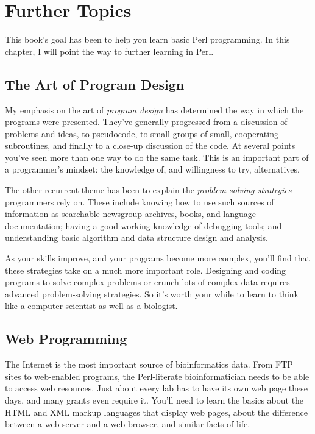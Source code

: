\chapter{Further Topics}
\label{chap:chapter13}
\minitoc

This book's goal has been to help you learn basic Perl programming. In this chapter, I will point the way to further learning in Perl.

\section{The Art of Program Design}
My emphasis on the art of \textit{program design} has determined the way in which the programs were presented. They've generally progressed from a discussion of problems and ideas, to pseudocode, to small groups of small, cooperating subroutines, and finally to a close-up discussion of the code. At several points you've seen more than one way to do the same task. This is an important part of a programmer's mindset: the knowledge of, and willingness to try, alternatives.

The other recurrent theme has been to explain the \textit{problem-solving strategies} programmers rely on. These include knowing how to use such sources of information as searchable newsgroup archives, books, and language documentation; having a good working knowledge of debugging tools; and understanding basic algorithm and data structure design and analysis.

As your skills improve, and your programs become more complex, you'll find that these strategies take on a much more important role. Designing and coding programs to solve complex problems or crunch lots of complex data requires advanced problem-solving strategies. So it's worth your while to learn to think like a computer scientist as well as a biologist.

\section{Web Programming}
The Internet is the most important source of bioinformatics data. From FTP sites to web-enabled programs, the Perl-literate bioinformatician needs to be able to access web resources. Just about every lab has to have its own web page these days, and many grants even require it. You'll need to learn the basics about the HTML and XML markup languages that display web pages, about the difference between a web server and a web browser, and similar facts of life.

